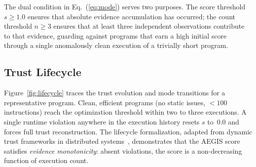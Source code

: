 \documentclass[conference]{IEEEtran}
\begin{document}
The dual condition in Eq.~(\ref{eq:mode}) serves two purposes. The
score threshold $s \geq 1.0$ ensures that absolute evidence
accumulation has occurred; the count threshold $n \geq 3$ ensures
that at least three independent observations contribute to that
evidence, guarding against programs that earn a high initial score
through a single anomalously clean execution of a trivially short
program.

\subsection{Trust Lifecycle}

Figure~\ref{fig:lifecycle} traces the trust evolution and mode
transitions for a representative program. Clean, efficient programs
(no static issues, $<\!100$ instructions) reach the optimization
threshold within two to three executions. A single runtime violation
anywhere in the execution history resets $s$ to~0.0 and forces
full trust reconstruction. The lifecycle formalization, adapted from
dynamic trust frameworks in distributed
systems~\cite{wang2022trust,ullah2024deeptrust}, demonstrates that
the AEGIS score satisfies \emph{evidence monotonicity}: absent
violations, the score is a non-decreasing function of execution
count.
\end{document}
